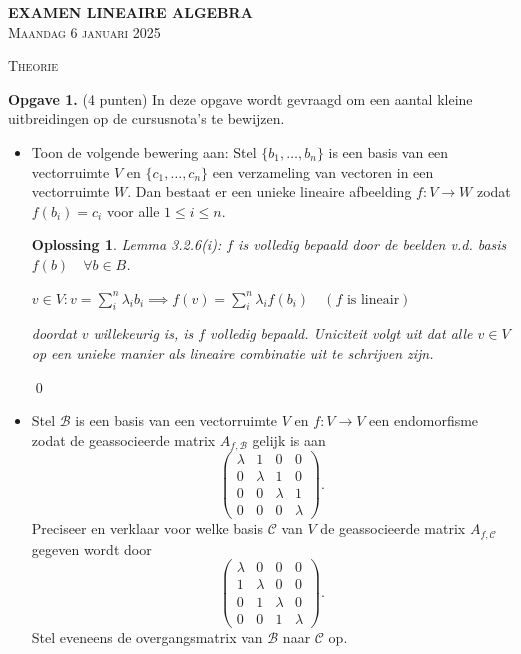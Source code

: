 \documentclass[a4paper,12pt]{article}
\newtheorem{oplossing}{Oplossing}
\begin{document}
\begin{enumerate}
\begin{center}
    \Large\textbf{EXAMEN LINEAIRE ALGEBRA} \\[0.5cm]
    \large\textsc{Maandag 6 januari 2025} \\[0.5cm]
\end{center}

\vspace{1cm}

\begin{center}
    \textsc{Theorie}
\end{center}

\textbf{Opgave 1.} (4 punten) In deze opgave wordt gevraagd om een aantal kleine uitbreidingen op de cursusnota's te bewijzen.
\begin{itemize}
    \item[(i)] Toon de volgende bewering aan: Stel $\{b_1, \dots, b_n\}$ is een basis van een vectorruimte $V$ en $\{c_1, \dots, c_n\}$ een verzameling van vectoren in een vectorruimte $W$. Dan bestaat er een unieke lineaire afbeelding $f : V \to W$ zodat $f(b_i) = c_i$ voor alle $1 \leq i \leq n$.
    \begin{oplossing}
    Lemma 3.2.6(i): $f$ is volledig bepaald door de beelden v.d. basis $f(b) \quad \forall b \in B$.

    

    $v \in V: v = \sum_i^n \lambda_i b_i \implies f(v) = \sum_i^n \lambda_i f(b_i) \quad (f \text{ is lineair})$


    doordat $v$ willekeurig is, is $f$ volledig bepaald.
    Uniciteit volgt uit dat alle $v \in V$ op een unieke manier als lineaire combinatie uit te schrijven zijn. 
    \end{oplossing} \qed

    \item[(ii)] Stel $\mathcal{B}$ is een basis van een vectorruimte $V$ en $f : V \to V$ een endomorfisme zodat de geassocieerde matrix $A_{f,\mathcal{B}}$ gelijk is aan
    \[
    \begin{pmatrix}
    \lambda & 1 & 0 & 0 \\
    0 & \lambda & 1 & 0 \\
    0 & 0 & \lambda & 1 \\
    0 & 0 & 0 & \lambda
    \end{pmatrix}.
    \]
    Preciseer en verklaar voor welke basis $\mathcal{C}$ van $V$ de geassocieerde matrix $A_{f,\mathcal{C}}$ gegeven wordt door
    \[
    \begin{pmatrix}
    \lambda & 0 & 0 & 0 \\
    1 & \lambda & 0 & 0 \\
    0 & 1 & \lambda & 0 \\
    0 & 0 & 1 & \lambda
    \end{pmatrix}.
    \]
    Stel eveneens de overgangsmatrix van $\mathcal{B}$ naar $\mathcal{C}$ op.
    

\end{itemize}
\end{enumerate}
\end{document}
